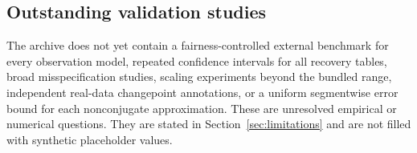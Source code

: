 \subsection{Outstanding validation studies}
The archive does not yet contain a fairness-controlled external benchmark for every observation model, repeated confidence intervals for all recovery tables, broad misspecification studies, scaling experiments beyond the bundled range, independent real-data changepoint annotations, or a uniform segmentwise error bound for each nonconjugate approximation. These are unresolved empirical or numerical questions. They are stated in Section~\ref{sec:limitations} and are not filled with synthetic placeholder values.
